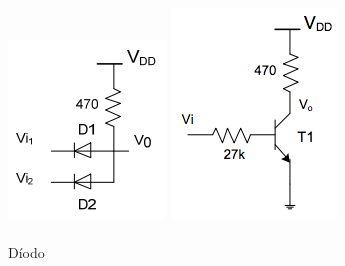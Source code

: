 \documentclass[pdftex,12pt,a4paper]{report}
\begin{document}
\begin{figure}[!htb]
  \includegraphics[width=\linewidth]{Imagens/Diodos.png}
  \caption{\\Díodo}\label{fig:fig_diodo}
\endminipage\hfill
{}
  \includegraphics[width=\linewidth]{Imagens/BJT.png}

\end{figure}
\end{document}
